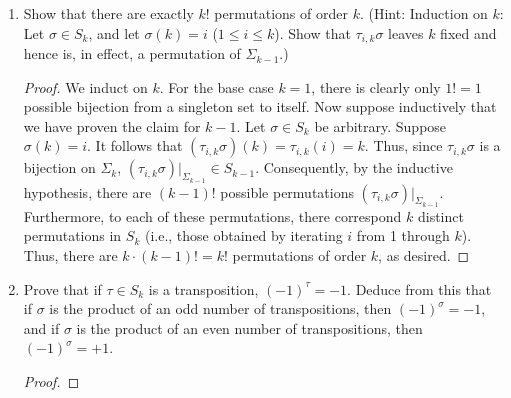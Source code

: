 \documentclass[../psets.tex]{subfiles}
\begin{document}
\begin{enumerate}[label={\textbf{1.4.\roman*.}}]
    \item Show that there are exactly $k!$ permutations of order $k$. (Hint: Induction on $k$: Let $\sigma\in S_k$, and let $\sigma(k)=i$ ($1\leq i\leq k$). Show that $\tau_{i,k}\sigma$ leaves $k$ fixed and hence is, in effect, a permutation of $\Sigma_{k-1}$.)
    \begin{proof}
        We induct on $k$. For the base case $k=1$, there is clearly only $1!=1$ possible bijection from a singleton set to itself. Now suppose inductively that we have proven the claim for $k-1$. Let $\sigma\in S_k$ be arbitrary. Suppose $\sigma(k)=i$. It follows that $(\tau_{i,k}\sigma)(k)=\tau_{i,k}(i)=k$. Thus, since $\tau_{i,k}\sigma$ is a bijection on $\Sigma_k$, $(\tau_{i,k}\sigma)|_{\Sigma_{k-1}}\in S_{k-1}$. Consequently, by the inductive hypothesis, there are $(k-1)!$ possible permutations $(\tau_{i,k}\sigma)|_{\Sigma_{k-1}}$. Furthermore, to each of these permutations, there correspond $k$ distinct permutations in $S_k$ (i.e., those obtained by iterating $i$ from 1 through $k$). Thus, there are $k\cdot(k-1)!=k!$ permutations of order $k$, as desired.
    \end{proof}
    \item Prove that if $\tau\in S_k$ is a transposition, $(-1)^\tau=-1$. Deduce from this that if $\sigma$ is the product of an odd number of transpositions, then $(-1)^\sigma=-1$, and if $\sigma$ is the product of an even number of transpositions, then $(-1)^\sigma=+1$.
    \begin{proof}





\end{proof}
\end{enumerate}
\end{document}

